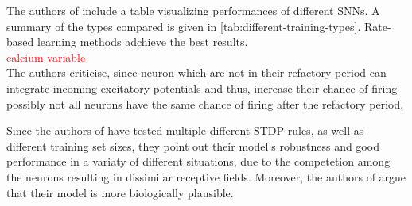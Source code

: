 The authors of \cite{SNN} include a table visualizing performances of different \acp{SNN}.
A summary of the types compared is given in \autoref{tab:different-training-types}.
Rate-based learning methods adchieve the best results.
\textcolor{red}{\\calcium variable\\}
The authors criticise, since neuron which are not in their refactory period can integrate incoming excitatory potentials and thus, 
increase their chance of firing possibly not all neurons have the same chance of firing after the refactory period.

Since the authors of \cite{SNN} have tested multiple different \ac{STDP} rules, as well as different training set sizes, 
they point out their model's robustness and good performance in a variaty of different situations, 
due to the competetion among the neurons resulting in dissimilar receptive fields.
Moreover, the authors of \cite{SNN} argue that their model is more biologically plausible.
